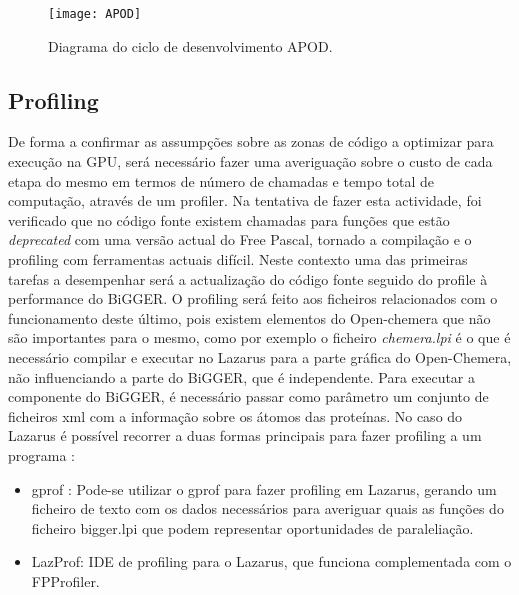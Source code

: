      \begin{figure}[ht]
  \centering
    {\texttt{[image: APOD]}}
  \caption{ Diagrama do ciclo de desenvolvimento APOD\cite{cudaProgGuide}.}
  \label{apodFig}
\end{figure}

\subsection {Profiling}
\label{profiling}
De forma a confirmar as assumpções sobre as zonas de código a optimizar para execução na GPU, será necessário fazer uma averiguação sobre o custo de cada etapa do mesmo em termos de número de chamadas e tempo total de computação, através de um profiler. Na tentativa de fazer esta actividade, foi verificado que no código fonte existem chamadas para funções que estão \textit{deprecated} com uma versão actual do Free Pascal, tornado a compilação e o profiling com ferramentas actuais difícil. Neste contexto uma das primeiras tarefas a desempenhar será a actualização do código fonte seguido do profile à performance do BiGGER. O profiling será feito aos ficheiros relacionados com o funcionamento deste último, pois existem elementos do Open-chemera que não são importantes para o mesmo, como por exemplo o ficheiro \textit{chemera.lpi} é o que é necessário compilar e executar no Lazarus para a parte gráfica do Open-Chemera, não influenciando a parte do BiGGER, que é independente. Para executar a componente do BiGGER, é necessário passar como parâmetro um conjunto de ficheiros xml com a informação sobre os átomos das proteínas.  No caso do Lazarus é possível recorrer a duas formas principais para fazer profiling a um programa \cite{lazProf}:
\begin{itemize}
\item gprof : Pode-se utilizar o gprof para fazer profiling em Lazarus, gerando um ficheiro de texto com os dados necessários para averiguar quais as funções do ficheiro bigger.lpi que podem representar oportunidades de paraleliação. 
\item LazProf: IDE de profiling para o Lazarus, que funciona complementada com o FPProfiler. 
\end{itemize}  

